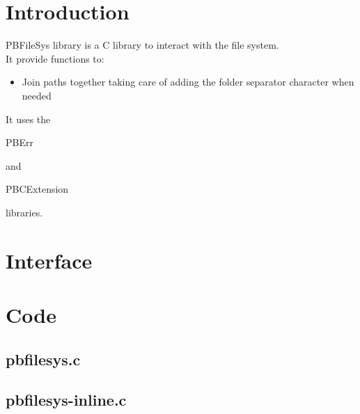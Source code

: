 \section*{Introduction}

PBFileSys library is a C library to interact with the file system.\\

It provide functions to:
\begin{itemize}
\item Join paths together taking care of adding the folder separator character when needed
\end{itemize}

It uses the \begin{ttfamily}PBErr\end{ttfamily} and \begin{ttfamily}PBCExtension\end{ttfamily} libraries.\\

\section{Interface}

\begin{scriptsize}
\begin{ttfamily}

\end{ttfamily}
\end{scriptsize}

\section{Code}

\subsection{pbfilesys.c}

\begin{scriptsize}
\begin{ttfamily}

\end{ttfamily}
\end{scriptsize}

\subsection{pbfilesys-inline.c}

\begin{scriptsize}
\begin{ttfamily}

\end{ttfamily}
\end{scriptsize}

